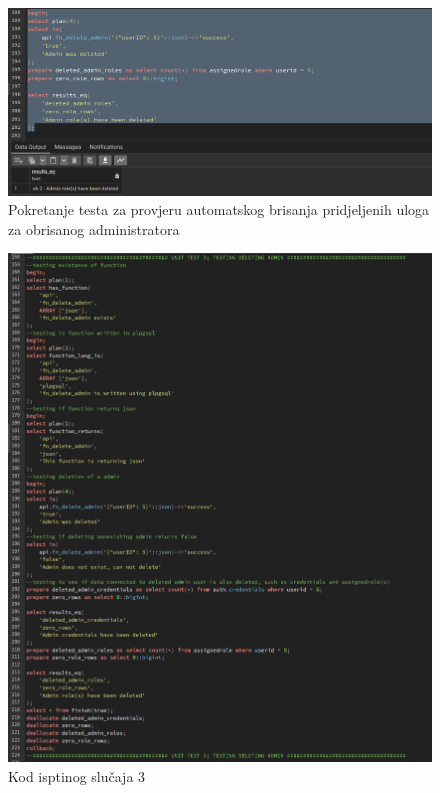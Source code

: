 				\begin{figure}[H]
					\centering
					\includegraphics[width=\textwidth]{slike/unit_tests/ut_3/role_deletion.png}
					\caption{Pokretanje testa za provjeru automatskog brisanja pridjeljenih uloga za obrisanog administratora}
					\label{fig: IS3-brisanje pridjeljenih uloga za obrisanog administratora}
				\end{figure}
				\begin{figure}[H]
					\centering
					\includegraphics[width=\textwidth]{slike/unit_tests/ut_3/code.png}
					\caption{Kod isptinog slučaja 3}
					\label{fig: IS3-kod}
				\end{figure}
				\eject
